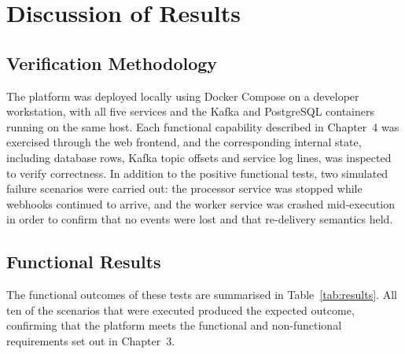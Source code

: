 \chapter{Discussion of Results}

\section{Verification Methodology}

The platform was deployed locally using Docker Compose on a developer workstation, with all five services and the Kafka and PostgreSQL containers running on the same host. Each functional capability described in Chapter~4 was exercised through the web frontend, and the corresponding internal state, including database rows, Kafka topic offsets and service log lines, was inspected to verify correctness. In addition to the positive functional tests, two simulated failure scenarios were carried out: the processor service was stopped while webhooks continued to arrive, and the worker service was crashed mid-execution in order to confirm that no events were lost and that re-delivery semantics held.

\section{Functional Results}

The functional outcomes of these tests are summarised in Table~\ref{tab:results}. All ten of the scenarios that were executed produced the expected outcome, confirming that the platform meets the functional and non-functional requirements set out in Chapter~3.

